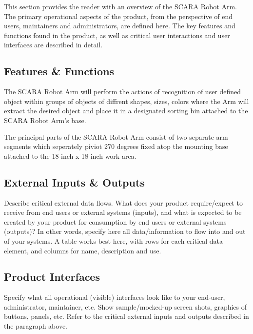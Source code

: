 This section provides the reader with an overview of the SCARA Robot Arm. The primary operational aspects of the product, from the perspective of end users, maintainers and administrators, are defined here. The key features and functions found in the product, as well as critical user interactions and user interfaces are described in detail.

\subsection{Features \& Functions}
The SCARA Robot Arm will perform the actions of recognition of user defined object within groups of objects of diffrent shapes, sizes, colors where the Arm will extract the desired object and place it in a designated sorting bin attached to the SCARA Robot Arm's base.

The principal parts of the SCARA Robot Arm consist of two separate arm segments which seperately piviot 270 degrees fixed atop the  mounting base attached to the 18 inch x 18 inch work area.   

\subsection{External Inputs \& Outputs}
Describe critical external data flows. What does your product require/expect to receive from end users or external systems (inputs), and what is expected to be created by your product for consumption by end users or external systems (outputs)? In other words, specify here all data/information to flow into and out of your systems. A table works best here, with rows for each critical data element, and columns for name, description and use.

\subsection{Product Interfaces}
Specify what all operational (visible) interfaces look like to your end-user, administrator, maintainer, etc. Show sample/mocked-up screen shots, graphics of buttons, panels, etc. Refer to the critical external inputs and outputs described in the paragraph above.
